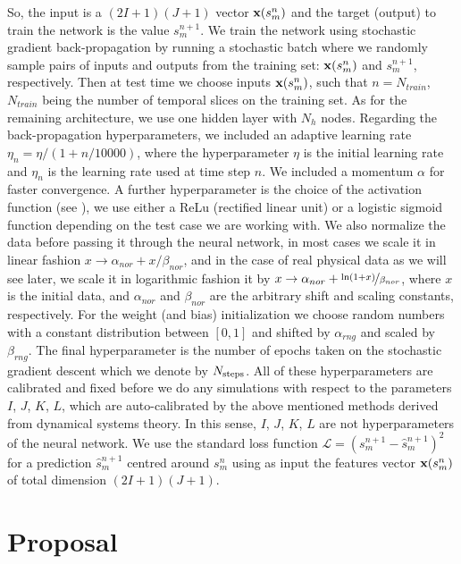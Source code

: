 \documentclass[journal]{IEEEtran}
\begin{document}
So, the input is a
$(2 I+1)(J+1)$ vector ${\bf x}(s^n_m)$ and the target (output) to train the network is the value $s^{n+1}_{m}$.
 We train the network using stochastic gradient
back-propagation by running a stochastic batch
where we randomly sample pairs of inputs and outputs from the training set: ${\bf x}(s^n_m)$ and $s^{n+1}_{m}$, respectively. Then at test time
we choose inputs ${\bf x}(s^n_m)$, such that $n=N_{train}$, $N_{train}$ being the number of temporal slices on the training set.
As for the remaining architecture, we use one hidden layer with $N_h$ nodes.
Regarding the back-propagation hyperparameters, we included an adaptive learning rate $\eta_n=\eta/(1+n/10000)$, 
where the hyperparameter $\eta$ is the initial learning rate and $\eta_n$ is the learning rate used at time step
$n$. We included a momentum $\alpha$ for faster convergence.
 A further hyperparameter is the choice of the activation function (see \cite{9780262527019}), we use either a ReLu (rectified linear unit)
 or a logistic sigmoid function depending on the
 test case we are working with.
We also normalize the data before passing it through the neural network, in most cases we scale it in linear fashion
$x \to \alpha_{nor} + x/\beta_{nor}$, and in the case of real physical data as we will see later, 
we scale it in logarithmic fashion it by $x \to \alpha_{nor}+\nicefrac{\ln(1+x)}{\beta_{nor}}$, where $x$ is the initial data,
and $\alpha_{nor}$ and $\beta_{nor}$ are the arbitrary shift and scaling constants, respectively. For the weight (and bias)
initialization we choose random numbers with a constant distribution between $[0,1]$ and shifted by $\alpha_{rng}$ and scaled
by $\beta_{rng}$. The final hyperparameter is the number of epochs taken on the stochastic gradient descent
which we denote by $N_{\textnormal{steps}}$.  
All of these hyperparameters are calibrated and fixed
before we do any simulations with respect to the parameters $I$, $J$, $K$, $L$, which are auto-calibrated by the above mentioned
methods derived from dynamical systems theory. In this sense, $I$, $J$, $K$, $L$ are not hyperparameters of the neural network. We use the standard
loss function $\mathcal{L}=\left( s^{n+1}_{m} - \hat{s}^{n+1}_{m}\right)^2$ for a prediction $\hat{s}^{n+1}_{m}$ 
centred around $s^{n}_{m}$ using as input
the features vector ${\bf x}(s^n_m)$ of total dimension  $(2 I+1)(J+1)$.




\section{Proposal}
\label{conjecturesection}
\end{document}
